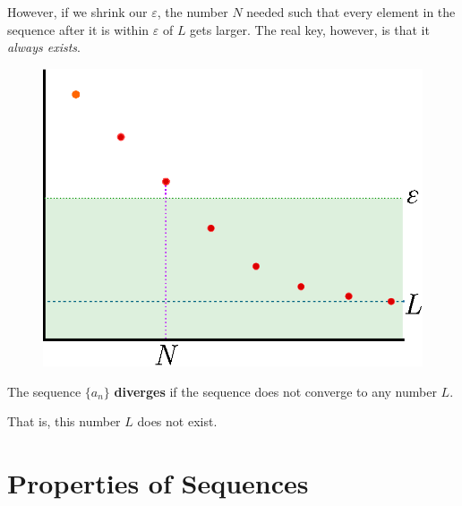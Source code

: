 \begin{ex}
\begin{figure}[H]
\begin{center}
    \end{center}
    \label{fig:conv2}
  \end{figure}
  However, if we shrink our $\varepsilon$, the number $N$ needed such that every element in the sequence after it
  is within $\varepsilon$ of $L$ gets larger. The real key, however, is that it \emph{always exists}.
  \begin{figure}[H]
    \begin{center}
      \includegraphics[scale=0.5]{continuous/sequence/conv3.eps}
    \end{center}
    \label{fig:conv3}
  \end{figure}
\end{ex}
\begin{defn}
  The sequence \(\{ a_n \}\) \textbf{diverges} if the sequence does not converge
  to any number \(L\).

  That is, this number $L$ does not exist.
\end{defn}

\section{Properties of Sequences}

